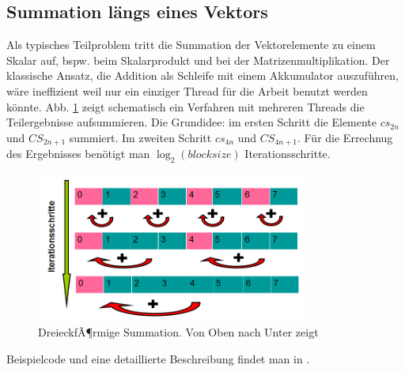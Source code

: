 


\subsection{Summation längs eines Vektors}

Als typisches Teilproblem tritt die Summation der Vektorelemente zu
einem Skalar auf, bspw. beim Skalarprodukt und bei der Matrizenmultiplikation.
Der klassische Ansatz, die Addition als Schleife mit einem Akkumulator
auszuführen, wäre ineffizient weil nur ein einziger Thread für die
Arbeit benutzt werden könnte.
Abb. \ref{Dreieck} zeigt schematisch ein Verfahren mit mehreren Threads
die Teilergebnisse aufsummieren.
Die Grundidee: im ersten Schritt die Elemente
$cs_{2n}$ und $CS_{2n+1}$ summiert.
Im zweiten Schritt $cs_{4n}$ und $CS_{4n+1}$. Für die Errechnug
des Ergebnisses benötigt man $ \log_2(blocksize)$ Iterationsschritte.

\begin{figure}[htbp]
\includegraphics[width=3.5in]{../xby/pic//dreieck}
\caption{\label{Dreieck}DreieckfÃ¶rmige Summation. Von Oben nach Unter zeigt}
\end{figure}

Beispielcode und eine detaillierte Beschreibung findet man in \cite{reduction}.

%
